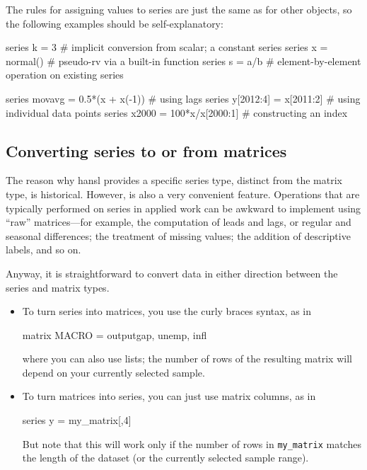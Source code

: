 The rules for assigning values to series are just the same as for
other objects, so the following examples should be self-explanatory:
\begin{code}
  series k = 3         # implicit conversion from scalar; a constant series
  series x = normal()  # pseudo-rv via a built-in function
  series s = a/b       # element-by-element operation on existing series

  series movavg = 0.5*(x + x(-1)) # using lags
  series y[2012:4] = x[2011:2]    # using individual data points
  series x2000 = 100*x/x[2000:1]  # constructing an index
\end{code}


\subsection{Converting series to or from matrices}

The reason why hansl provides a specific series type, distinct from
the matrix type, is historical. However, is also a very convenient
feature.  Operations that are typically performed on series in applied
work can be awkward to implement using ``raw'' matrices---for example,
the computation of leads and lags, or regular and seasonal
differences; the treatment of missing values; the addition of
descriptive labels, and so on.

Anyway, it is straightforward to convert data in either direction
between the series and matrix types.
\begin{itemize}
\item To turn series into matrices, you use the curly braces syntax,
  as in
  \begin{code}
    matrix MACRO = {outputgap, unemp, infl}
  \end{code}
  where you can also use lists; the number of rows of the resulting
  matrix will depend on your currently selected sample.
\item To turn matrices into series, you can just use matrix columns,
  as in
  \begin{code}
    series y = my_matrix[,4]
  \end{code}
  But note that this will work only if the number of rows in
  \texttt{my\_matrix} matches the length of the dataset (or the
  currently selected sample range).
\end{itemize}

